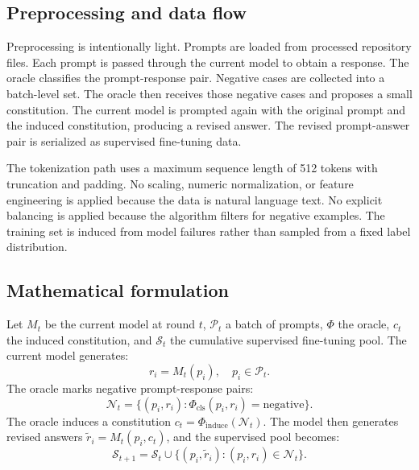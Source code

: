 \documentclass[10pt,twocolumn]{article}
\begin{document}
\subsection{Preprocessing and data flow}
Preprocessing is intentionally light. Prompts are loaded from processed repository files. Each prompt is passed through the current model to obtain a response. The oracle classifies the prompt-response pair. Negative cases are collected into a batch-level set. The oracle then receives those negative cases and proposes a small constitution. The current model is prompted again with the original prompt and the induced constitution, producing a revised answer. The revised prompt-answer pair is serialized as supervised fine-tuning data.

The tokenization path uses a maximum sequence length of 512 tokens with truncation and padding. No scaling, numeric normalization, or feature engineering is applied because the data is natural language text. No explicit balancing is applied because the algorithm filters for negative examples. The training set is induced from model failures rather than sampled from a fixed label distribution.

\subsection{Mathematical formulation}
Let $M_t$ be the current model at round $t$, $\mathcal{P}_t$ a batch of prompts, $\Phi$ the oracle, $c_t$ the induced constitution, and $\mathcal{S}_t$ the cumulative supervised fine-tuning pool. The current model generates:
\begin{equation}
  r_i = M_t(p_i), \quad p_i \in \mathcal{P}_t.
  \label{eq:response}
\end{equation}
The oracle marks negative prompt-response pairs:
\begin{equation}
  \mathcal{N}_t = \{(p_i,r_i): \Phi_{\text{cls}}(p_i,r_i)=\text{negative}\}.
  \label{eq:negative}
\end{equation}
The oracle induces a constitution $c_t=\Phi_{\text{induce}}(\mathcal{N}_t)$. The model then generates revised answers $\tilde{r}_i=M_t(p_i,c_t)$, and the supervised pool becomes:
\begin{equation}
  \mathcal{S}_{t+1} = \mathcal{S}_{t} \cup \{(p_i,\tilde{r}_i):(p_i,r_i)\in \mathcal{N}_t\}.
  \label{eq:sftpool}
\end{equation}
\end{document}
